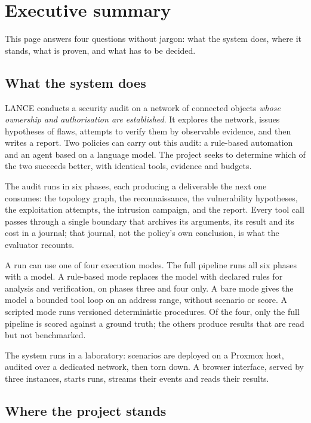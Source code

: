 \section{Executive summary}

This page answers four questions without jargon: what the system does, where it
stands, what is proven, and what has to be decided.

\subsection{What the system does}

LANCE conducts a security audit on a network of connected objects \emph{whose
ownership and authorisation are established}. It explores the network, issues
hypotheses of flaws, attempts to verify them by observable evidence, and then
writes a report. Two policies can carry out this audit: a rule-based automation
and an agent based on a language model. The project seeks to determine which of
the two succeeds better, with identical tools, evidence and budgets.

The audit runs in six phases, each producing a deliverable the next one consumes:
the topology graph, the reconnaissance, the vulnerability hypotheses, the
exploitation attempts, the intrusion campaign, and the report. Every tool call
passes through a single boundary that archives its arguments, its result and its
cost in a journal; that journal, not the policy's own conclusion, is what the
evaluator recounts.

A run can use one of four execution modes. The full pipeline runs all six phases
with a model. A rule-based mode replaces the model with declared rules for
analysis and verification, on phases three and four only. A bare mode gives the
model a bounded tool loop on an address range, without scenario or score. A
scripted mode runs versioned deterministic procedures. Of the four, only the full
pipeline is scored against a ground truth; the others produce results that are
read but not benchmarked.

The system runs in a laboratory: scenarios are deployed on a Proxmox host, audited
over a dedicated network, then torn down. A browser interface, served by three
instances, starts runs, streams their events and reads their results.

\subsection{Where the project stands}

